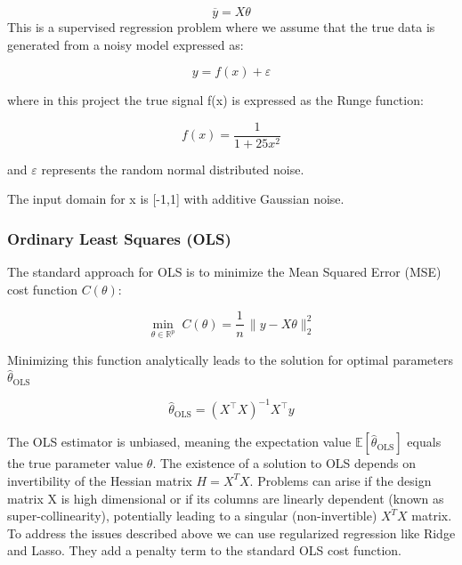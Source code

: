 \documentclass[amssymb,twocolumn,aps]{revtex4}
\begin{document}
\begin{equation}
    \overline{y} = X \theta
\end{equation}
This is a supervised regression problem where we assume that the true data is generated from a noisy model expressed as: 

\begin{equation}
y = f(x)+\varepsilon
\end{equation}

where in this project the true signal f(x) is expressed as the Runge function:

\begin{equation}
    f(x) = \frac{1}{1 + 25x^2}
    \label{eq:runge}
\end{equation}

and $\varepsilon$ represents the random normal distributed noise. 

The input domain for x is [-1,1] with additive Gaussian noise. 
\subsubsection{Ordinary Least Squares (OLS)}

The standard approach for OLS is to minimize the Mean Squared Error (MSE) cost function $C (\theta)$: 

\begin{equation}
    \min_{\theta\in\mathbb{R}^p} \; C(\theta)
= \frac{1}{n}\,\lVert y - X\theta \rVert_2^2
\end{equation}

Minimizing this function analytically leads to the solution for optimal parameters $\hat{\theta}_{\text{OLS}}$

\begin{equation}
\hat{\theta}_{\text{OLS}} = (X^\top X)^{-1} X^\top y
\end{equation}

The OLS estimator is unbiased, meaning the expectation value $\mathbb{E}\!\left[\hat{\theta}_{\text{OLS}}\right]$ equals the true parameter value $\theta$. The existence of a solution to OLS depends on invertibility of the Hessian matrix $H=X^TX$. Problems can arise if the design matrix X is high dimensional or if its columns are linearly dependent (known as super-collinearity), potentially leading to a singular (non-invertible) $X^TX$ matrix. \\

To address the issues described above we can use regularized regression like Ridge and Lasso. They add a penalty term to the standard OLS cost function. \\
\end{document}
